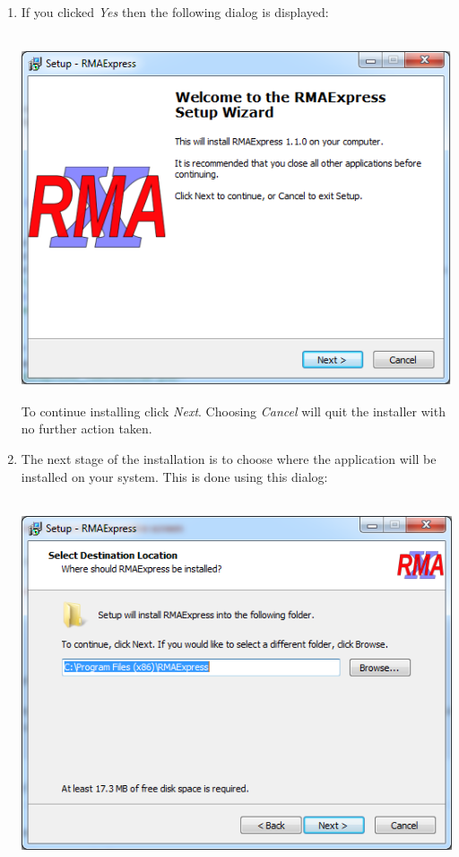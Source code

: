 \documentclass[11pt]{report}
\begin{document}
\begin{enumerate}
\item If you clicked {\it Yes} then the following dialog is displayed:\\ \\
\begin{center}
\includegraphics[scale=0.5]{Setup1}
\end{center}
To continue installing click {\it Next}. Choosing {\it Cancel} will quit the installer with no further action taken. 
\item The next stage of the installation is to choose where the application will be installed on your system. This is done using this dialog:
\\
\\
\begin{center}
\includegraphics[scale=0.5]{Setup2}

\end{center}
\end{enumerate}
\end{document}
